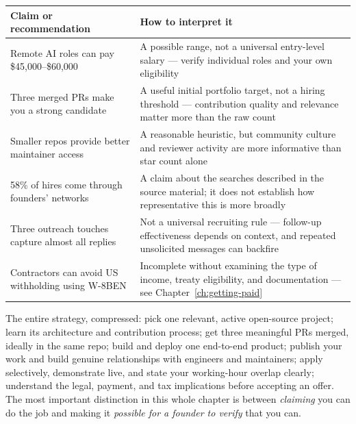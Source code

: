 \begin{longtable}{p{} p{}}
\toprule
\textbf{Claim or recommendation} & \textbf{How to interpret it} \\
\midrule
\endhead
Remote AI roles can pay \$45,000--\$60,000 & A possible range, not a universal entry-level salary — verify
individual roles and your own eligibility \\
Three merged PRs make you a strong candidate & A useful initial portfolio target, not a hiring threshold —
contribution quality and relevance matter more than the raw count \\
Smaller repos provide better maintainer access & A reasonable heuristic, but community culture and reviewer
activity are more informative than star count alone \\
58\% of hires come through founders' networks & A claim about the searches described in the source material; it
does not establish how representative this is more broadly \\
Three outreach touches capture almost all replies & Not a universal recruiting rule — follow-up effectiveness
depends on context, and repeated unsolicited messages can backfire \\
Contractors can avoid US withholding using W-8BEN & Incomplete without examining the type of income, treaty
eligibility, and documentation — see Chapter~\ref{ch:getting-paid} \\
\bottomrule
\end{longtable}

\begin{keytakeaway}
The entire strategy, compressed: pick one relevant, active open-source project; learn its architecture and
contribution process; get three meaningful PRs merged, ideally in the same repo; build and deploy one
end-to-end product; publish your work and build genuine relationships with engineers and maintainers; apply
selectively, demonstrate live, and state your working-hour overlap clearly; understand the legal, payment, and
tax implications before accepting an offer. The most important distinction in this whole chapter is between
\emph{claiming} you can do the job and making it \emph{possible for a founder to verify} that you can.
\end{keytakeaway}

